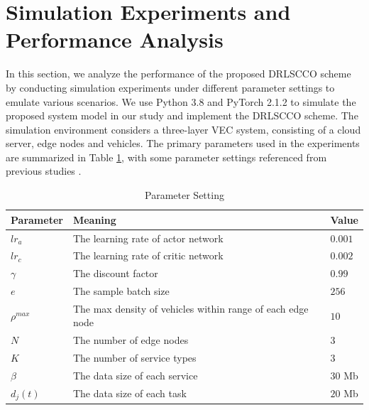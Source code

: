 \documentclass[lettersize,journal]{IEEEtran}
\begin{document}
\section{Simulation Experiments and Performance Analysis}
In this section, we analyze the performance of the proposed DRLSCCO scheme by conducting simulation experiments under different parameter settings to emulate various scenarios. 
We use Python 3.8 and PyTorch 2.1.2 to simulate the proposed system model in our study and implement the DRLSCCO scheme.
The simulation environment considers a three-layer VEC system, consisting of a cloud server, edge nodes and vehicles. 
The primary parameters used in the experiments are summarized in Table \ref{tab: experiment parameters}, with some parameter settings referenced from previous studies \cite{SB, GZ}. 
\begin{table}
	\caption{Parameter Setting}
	\label{tab: experiment parameters}
	\begin{center}
		\begin{tabularx}{\linewidth}{X p{4.7cm} X}
		\hline
		\textbf{Parameter} 	& \textbf{Meaning} & \textbf{Value}  							\\ \hline
			$ lr_a $		&	The learning rate of actor network			&	$ 0.001 $	\\
			$ lr_c $		&	The learning rate of critic network			&	$ 0.002 $	\\
			$ \gamma $		&	The discount factor							&	$ 0.99 $	\\
			$ e $			&	The sample batch size						&	$ 256 $		\\
			$ \rho^{max} $ & The max density of vehicles within range of each edge node & $ 10 $																				\\
			$ N $			& The number of edge nodes 						& $ 3 $ 																			  \\
			$ K $			& The number of service types					& $ 3 $ 																			\\
			$ \beta $		& The data size of each service					& $ 30 $ Mb 		\\
			$ d_j(t) $			& The data size of each task					& $ 20 $ Mb	\\

\end{tabularx}
\end{center}
\end{table}
\end{document}

